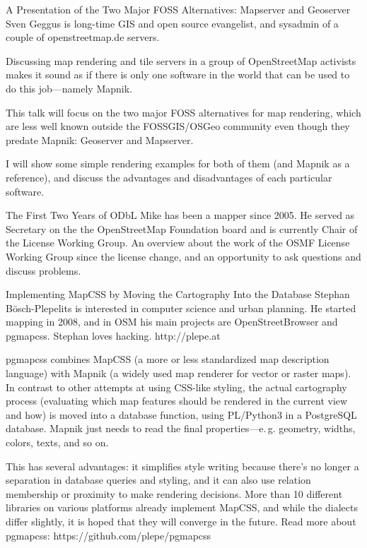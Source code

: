%
{A Presentation of the Two Major FOSS Alternatives: Mapserver and Geoserver}%
{Sven Geggus is long-time GIS and open source evangelist, and sysadmin of a couple of openstreetmap.de servers.}%
{Discussing map rendering and tile servers in a group of OpenStreetMap activists makes it sound as if there is only one software in the world that can be used to do this job---namely Mapnik.

This talk will focus on the two major FOSS alternatives for map rendering, which are less well
known outside the FOSSGIS/OSGeo community even though they predate Mapnik: Geoserver and Mapserver.

I will show some simple rendering examples for both of them (and Mapnik as a reference), and discuss the advantages and disadvantages of each particular software.}

%
{The First Two Years of ODbL}%
{Mike has been a mapper since 2005. He served as Secretary on the the OpenStreetMap Foundation board and is currently Chair of the License Working Group. }%
{An overview about the work of the OSMF License Working Group since the license change, and an opportunity to ask questions and discuss problems. }

%
{Implementing MapCSS by Moving the Cartography Into the Database}%
{Stephan Bösch-Plepelits is interested in computer science and urban planning. He started mapping in 2008, and in OSM his main projects are OpenStreetBrowser and pgmapcss. Stephan loves hacking. http://plepe.at }%
{pgmapcss combines MapCSS (a more or less standardized map description language) with Mapnik (a widely used map renderer for vector or raster maps). In contrast to other attempts at using CSS-like styling, the actual cartography process (evaluating which map features should be rendered  in the current view and how) is moved into a database function, using PL/Python3 in a PostgreSQL database. Mapnik just needs to read the final properties---e.\,g. geometry, widths, colors, texts, and so on.

This has several advantages: it simplifies style writing because there's no longer a separation in database queries and styling, and it can also use relation membership or proximity to make rendering decisions. More than 10 different libraries on various platforms already implement MapCSS, and while the dialects differ slightly, it is hoped that they will converge in the future. Read more about pgmapcss: https://github.com/plepe/pgmapcss}

